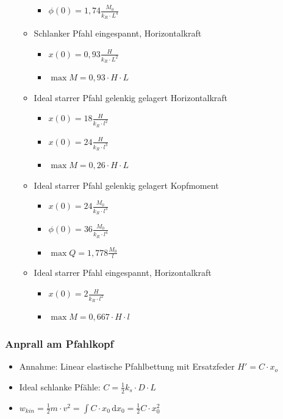 \documentclass[fleqn,twoside]{article}
\begin{document}
\begin{itemize}
\begin{itemize}
\begin{itemize}
            \item $\phi(0)=1,74\frac{M_0}{k_R\cdot L^4}$
        \end{itemize}
        \item Schlanker Pfahl eingespannt, Horizontalkraft
        \begin{itemize}
            \item $x(0)=0,93\frac{H}{k_R\cdot L^2}$
            \item $\max M=0,93\cdot H\cdot L$
        \end{itemize}
        \item Ideal starrer Pfahl gelenkig gelagert Horizontalkraft
        \begin{itemize}
            \item $x(0)=18\frac{H}{k_R\cdot l^2}$
            \item $x(0)=24\frac{H}{k_R\cdot l^3}$
            \item $\max M=0,26\cdot H\cdot L$
        \end{itemize}
        \item Ideal starrer Pfahl gelenkig gelagert Kopfmoment
        \begin{itemize}
            \item $x(0)=24\frac{M_0}{k_R\cdot l^3}$
            \item $\phi(0)=36\frac{M_0}{k_R\cdot l^4}$
            \item $\max Q=1,778\frac{M_0}{l}$
        \end{itemize}
        \item Ideal starrer Pfahl eingespannt, Horizontalkraft
        \begin{itemize}
            \item $x(0)=2\frac{H}{k_R\cdot l^2}$
            \item $\max M=0,667\cdot H\cdot l$
        \end{itemize}
    \end{itemize}
\end{itemize}

\subsubsection{Anprall am Pfahlkopf}
\begin{itemize}
    \item Annahme: Linear elastische Pfahlbettung mit Ersatzfeder $H'=C\cdot x_o$
    \item Ideal schlanke Pfähle: $C=\frac12k_s \cdot D\cdot L$
    \item $w_{kin}=\frac12 m\cdot v^2=\int C\cdot x_0\,\text{d}x_0=\frac12C\cdot x_0^2$
\end{itemize}
\end{document}
